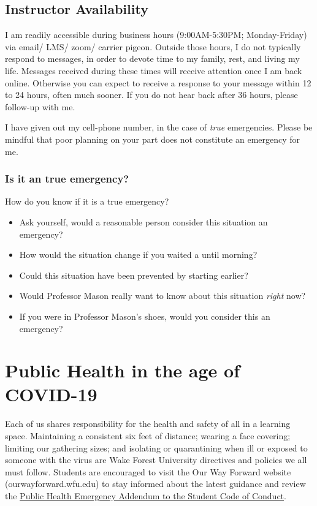 \documentclass[11pt,]{article}
\providecommand{\tightlist}{%
  \setlength{\itemsep}{0pt}\setlength{\parskip}{0pt}}
\begin{document}
\hypertarget{instructor-availability}{%
\subsection{Instructor Availability}\label{instructor-availability}}

I am readily accessible during business hours (9:00AM-5:30PM;
Monday-Friday) via email/ LMS/ zoom/ carrier pigeon. Outside those
hours, I do not typically respond to messages, in order to devote time
to my family, rest, and living my life. Messages received during these
times will receive attention once I am back online. Otherwise you can
expect to receive a response to your message within 12 to 24 hours,
often much sooner. If you do not hear back after 36 hours, please
follow-up with me.

I have given out my cell-phone number, in the case of \emph{true}
emergencies. Please be mindful that poor planning on your part does not
constitute an emergency for me.

\hypertarget{is-it-an-true-emergency}{%
\subsubsection{Is it an true emergency?}\label{is-it-an-true-emergency}}

How do you know if it is a true emergency?

\begin{itemize}
\tightlist
\item
  Ask yourself, would a reasonable person consider this situation an
  emergency?
\item
  How would the situation change if you waited a until morning?
\item
  Could this situation have been prevented by starting earlier?
\item
  Would Professor Mason really want to know about this situation
  \emph{right} now?
\item
  If you were in Professor Mason's shoes, would you consider this an
  emergency?
\end{itemize}

\hypertarget{public-health-in-the-age-of-covid-19}{%
\section{Public Health in the age of
COVID-19}\label{public-health-in-the-age-of-covid-19}}

Each of us shares responsibility for the health and safety of all in a
learning space. Maintaining a consistent six feet of distance; wearing a
face covering; limiting our gathering sizes; and isolating or
quarantining when ill or exposed to someone with the virus are Wake
Forest University directives and policies we all must follow. Students
are encouraged to visit the Our Way Forward website
(ourwayforward.wfu.edu) to stay informed about the latest guidance and
review the
\href{https://studentconduct.wfu.edu/undergraduate-student-handbook/minimum_expectations/public-health-emergency-addendum/}{Public
Health Emergency Addendum to the Student Code of Conduct}.
\end{document}
